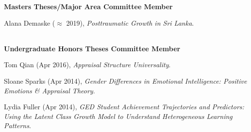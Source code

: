 {\large \textbf{Masters Theses/Major Area Committee Member}}%
\begin{etaremune}%
\item Alana Demaske ($\approx$ 2019), \textit{Posttraumatic Growth in Sri Lanka}.%
\end{etaremune}\\
%
{\large \textbf{Undergraduate Honors Theses Committee Member}}
\begin{etaremune}\item Tom Qian (Apr 2016), \textit{Appraisal Structure Universality}.%
%
\item Sloane Sparks (Apr 2014), \textit{Gender Differences in Emotional Intelligence: Positive Emotions \& Appraisal Theory}.%
\item Lydia Fuller (Apr 2014), \textit{GED Student Achievement Trajectories and Predictors: Using the Latent Class Growth Model to Understand Heterogeneous Learning Patterns}.%
\end{etaremune}
